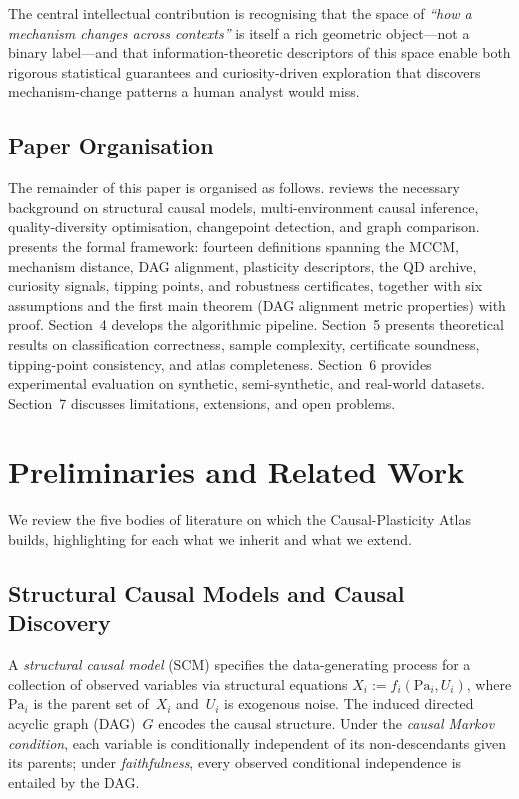 \documentclass[11pt,a4paper]{article}
\theoremstyle{definition}
\newcommand{\Pa}{\mathrm{Pa}}                 %
\begin{document}
The central intellectual contribution is recognising that the space of
\emph{``how a mechanism changes across contexts''} is itself a rich
geometric object---not a binary label---and that information-theoretic
descriptors of this space enable both rigorous statistical guarantees and
curiosity-driven exploration that discovers mechanism-change patterns a
human analyst would miss.

\subsection{Paper Organisation}

The remainder of this paper is organised as follows.
 reviews the necessary background on structural causal
models, multi-environment causal inference, quality-diversity optimisation,
changepoint detection, and graph comparison.
 presents the formal framework: fourteen definitions
spanning the MCCM, mechanism distance, DAG alignment, plasticity
descriptors, the QD archive, curiosity signals, tipping points, and
robustness certificates, together with six assumptions and the first main
theorem (DAG alignment metric properties) with proof.
Section~4 develops the algorithmic pipeline.
Section~5 presents theoretical results on classification correctness,
sample complexity, certificate soundness, tipping-point consistency, and
atlas completeness.
Section~6 provides experimental evaluation on synthetic, semi-synthetic,
and real-world datasets.
Section~7 discusses limitations, extensions, and open problems.

\section{Preliminaries and Related Work}\label{sec:prelim}

We review the five bodies of literature on which the Causal-Plasticity
Atlas builds, highlighting for each what we inherit and what we extend.

\subsection{Structural Causal Models and Causal Discovery}

A \emph{structural causal model} (SCM)
\citep{pearl2009causality,spirtes2000causation} specifies the
data-generating process for a collection of observed variables via
structural equations $X_i := f_i(\Pa_i, U_i)$, where $\Pa_i$ is the
parent set of~$X_i$ and~$U_i$ is exogenous noise.  The induced directed
acyclic graph (DAG)~$G$ encodes the causal structure.  Under the
\emph{causal Markov condition}, each variable is conditionally independent
of its non-descendants given its parents; under \emph{faithfulness}, every
observed conditional independence is entailed by the DAG.
\end{document}
